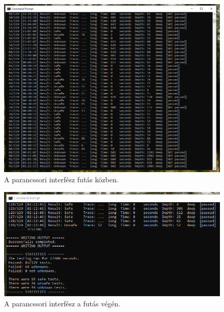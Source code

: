\begin{figure}[!ht]
	\label{fig:cli_2bb}
	\centering
	\includegraphics[width=135mm, keepaspectratio]{figures/cli/kozepe.png}
	\caption{A parancssori interfész futás közben.} 
\end{figure}

\begin{figure}[!ht]
	\centering
	\includegraphics[width=135mm, keepaspectratio]{figures/cli/vege.png}
	\caption{A parancssori interfész a futás végén.\label{fig:cli_3}} 
\end{figure}
